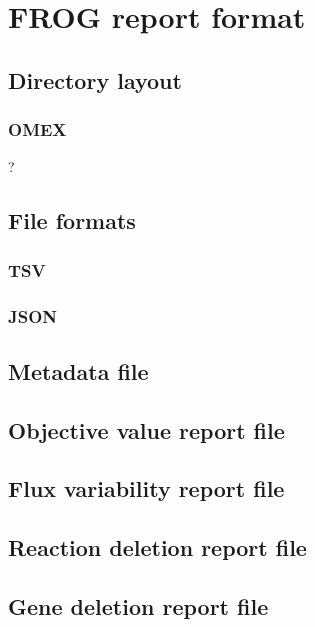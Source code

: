 \chapter{FROG report format}

\section{Directory layout}

\subsection{OMEX}

?

\section{File formats}

\subsection{TSV}

\subsection{JSON}

\section{Metadata file}

\section{Objective value report file}

\section{Flux variability report file}

\section{Reaction deletion report file}

\section{Gene deletion report file}
